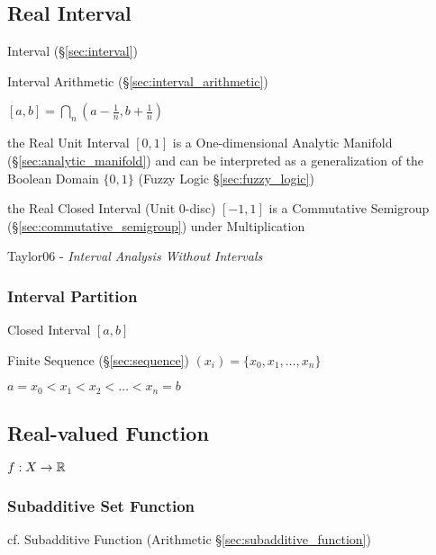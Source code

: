 \subsection{Real Interval}\label{sec:real_interval}

Interval (\S\ref{sec:interval})

Interval Arithmetic (\S\ref{sec:interval_arithmetic})

$[a,b] = \bigcap_n (a - \frac{1}{n}, b + \frac{1}{n})$

the Real Unit Interval $[0,1]$ is a One-dimensional Analytic Manifold
(\S\ref{sec:analytic_manifold}) and can be interpreted as a generalization of
the Boolean Domain $\{0, 1\}$ (Fuzzy Logic \S\ref{sec:fuzzy_logic})

the Real Closed Interval (Unit 0-disc) $[-1,1]$ is a Commutative Semigroup
(\S\ref{sec:commutative_semigroup}) under Multiplication

Taylor06 - \emph{Interval Analysis Without Intervals}



\subsubsection{Interval Partition}\label{sec:interval_partition}

Closed Interval $[a,b]$

Finite Sequence (\S\ref{sec:sequence}) $(x_i) = \{ x_0, x_1, \ldots,
x_n \}$

$a = x_0 < x_1 < x_2 < \ldots < x_n = b$



\subsection{Real-valued Function}\label{sec:real_valued}

$f : X \rightarrow \mathbb{R}$



\subsubsection{Subadditive Set Function}\label{sec:subadditive_set_function}

cf. Subadditive Function (Arithmetic \S\ref{sec:subadditive_function})

